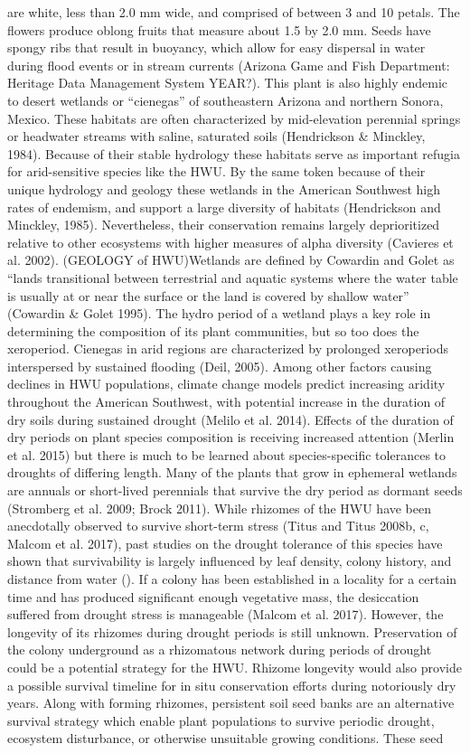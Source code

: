 \documentclass[multicol]{elsarticle}
\begin{document}
\begin{multicols}{2}
are white, less than 2.0 mm wide, and comprised of between 3 and 10 petals. The flowers produce oblong fruits that measure about 1.5 by 2.0 mm.  Seeds have spongy ribs that result in buoyancy, which allow for easy dispersal in water during flood events or in stream currents (Arizona Game and Fish Department: Heritage Data Management System YEAR?). This plant is also highly endemic to desert wetlands or “cienegas” of southeastern Arizona and northern Sonora, Mexico. These habitats are often characterized by mid-elevation perennial springs or headwater streams with saline, saturated soils (Hendrickson & Minckley, 1984). Because of their stable hydrology these habitats serve as important refugia for arid-sensitive species like the HWU. By the same token because of their unique hydrology and geology these wetlands in the American Southwest high rates of endemism, and support a large diversity of habitats (Hendrickson and Minckley, 1985). Nevertheless, their conservation remains largely deprioritized relative to other ecosystems with higher measures of alpha diversity (Cavieres et al. 2002). (GEOLOGY of HWU)Wetlands are defined by Cowardin and Golet as “lands transitional between terrestrial and aquatic systems where the water table is usually at or near the surface or the land is covered by shallow water” (Cowardin & Golet 1995). The hydro period of a wetland plays a key role in determining the composition of its plant communities, but so too does the xeroperiod. Cienegas in arid regions are characterized by prolonged xeroperiods interspersed by sustained flooding (Deil, 2005). Among other factors causing declines in HWU populations, climate change models predict increasing aridity throughout the American Southwest, with potential increase in the duration of dry soils during sustained drought (Melilo et al. 2014).  Effects of the duration of dry periods on plant species composition is receiving increased attention (Merlin et al. 2015) but there is much to be learned about species-specific tolerances to droughts of differing length. Many of the plants that grow in ephemeral wetlands are annuals or short-lived perennials that survive the dry period as dormant seeds (Stromberg et al. 2009; Brock 2011).  While rhizomes of the HWU have been anecdotally observed to survive short-term stress (Titus and Titus 2008b, c, Malcom et al. 2017), past studies on the drought tolerance of this species have shown that survivability is largely influenced by leaf density, colony history, and distance from water (). If a colony has been established in a locality for a certain time and has produced significant enough vegetative mass, the desiccation suffered from drought stress is manageable (Malcom et al. 2017). However, the longevity of its rhizomes during drought periods is still unknown. Preservation of the colony underground as a rhizomatous network during periods of drought could be a potential strategy for the HWU. Rhizome longevity would also provide a possible survival timeline for in situ conservation efforts during notoriously dry years. Along with forming rhizomes, persistent soil seed banks are an alternative survival strategy which enable plant populations to survive periodic drought, ecosystem disturbance, or otherwise unsuitable growing conditions. These seed 
\end{multicols}
\end{document}
